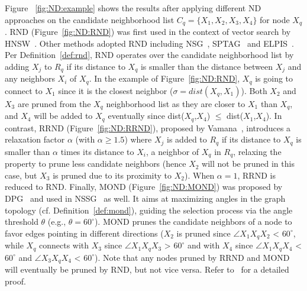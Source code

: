 Figure ~\ref{fig:ND:example} shows the results after applying different ND approaches on the candidate neighborhood list \( C_q = \{ X_1, X_2, X_3, X_4 \} \) for node \( X_q \).
RND (Figure~\ref{fig:ND:RND}) was first used in the context of vector search by HNSW~\cite{hnsw}. Other methods adopted RND including NSG~\cite{nsg}, SPTAG~\cite{SPTAG4} and ELPIS~\cite{elpis}.  Per Definition~\ref{def:rnd}, RND operates over the candidate neighborhood list by adding $X_j$ to $R_q$ if its distance to $X_q$ is smaller than the distance between $X_j$ and any neighbors $X_i$ of $X_q$. 
In the example of Figure~\ref{fig:ND:RND}, $X_q$ is going to connect to $X_1$ since it is the closest neighbor ($\sigma = dist\left(X_q,X_1\right)$). Both $X_2$ and $X_3$ are pruned from the $X_q$ neighborhood list as they are closer to $X_1$ than $X_q$, and $X_4$ will be added to $X_q$ eventually since dist($X_q$,$X_4$) $\leq$ dist($X_1$,$X_4$).
In contrast, RRND (Figure~\ref{fig:ND:RRND}), proposed by Vamana~\cite{vamana}, introduces a relaxation factor $\alpha$ (with $\alpha \geq 1.5$) where $X_j$ is added to $R_q$ if its distance to $X_q$ is smaller than $\alpha$ times its distance to $X_i$, a neighbor of $X_q$ in $R_q$, relaxing the property to prune less candidate neighbors (hence $X_2$ will not be pruned in this case, but $X_3$ is pruned due to its proximity to $X_2$). 
When $\alpha = 1$, RRND is reduced to RND.
Finally, MOND (Figure~\ref{fig:ND:MOND}) was proposed by DPG~\cite{dpg} and used in NSSG~\cite{nssg} as well. 
It aims at maximizing angles in the graph topology (cf. Definition~\ref{def:mond}), guiding the selection process via the angle threshold $\theta$ (e.g., $\theta = 60^\circ$). MOND prunes the candidate neighbors of a node to favor edges pointing in different directions ($X_2$ is pruned since $\angle X_1X_qX_2$ < $60^\circ$, while $X_q$ connects with $X_3$ since  $\angle X_1X_qX_3$ > $60^\circ$ and with $X_4$ since  $\angle X_1X_qX_4$ < $60^\circ$ and  $\angle X_3X_qX_4$ < $60^\circ$). 
Note that any nodes pruned by RRND and MOND will eventually be pruned by RND, but not vice versa. 
Refer to~\cite{url/GASS} for a detailed proof.
